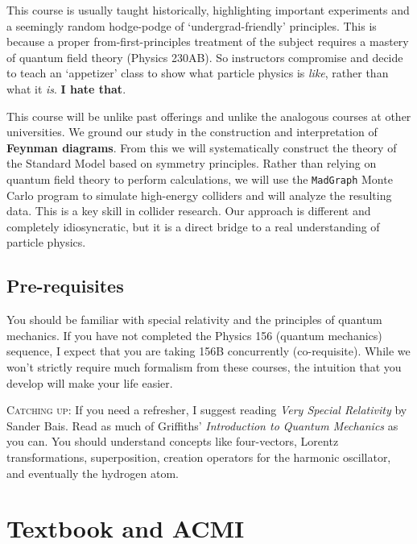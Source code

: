 \documentclass[12pt]{article}
\numberwithin{equation}{section}    %
\begin{document}
This course is usually taught historically,  highlighting important experiments and a seemingly random hodge-podge of `undergrad-friendly' principles. This is because a proper from-first-principles treatment of the subject requires a mastery of quantum field theory (Physics 230AB). So instructors compromise and decide to teach an `appetizer' class to show what particle physics is \emph{like}, rather than what it \emph{is}. \textbf{I hate that}.


This course will be unlike past offerings and unlike the analogous courses at other universities.
%
We ground our study in the construction and interpretation of \textbf{Feynman diagrams}. From this we will systematically construct the theory of the Standard Model based on symmetry principles. Rather than relying on quantum field theory to perform calculations, we will use the \texttt{MadGraph} Monte Carlo program to simulate high-energy colliders and will analyze the resulting data. This is a key skill in collider research.
%
Our approach is different and completely idiosyncratic, but it is a direct bridge to a real understanding of particle physics.



\subsection*{Pre-requisites}

You should be familiar with special relativity and the principles of quantum mechanics. If you have not completed the Physics 156 (quantum mechanics) sequence, I expect that you are taking 156B concurrently (co-requisite). While we won't strictly require much formalism from these courses, the intuition that you develop will make your life easier. 

\textsc{Catching up:} If you need a refresher, I suggest reading \emph{Very Special Relativity} by Sander Bais. Read as much of Griffiths' \emph{Introduction to Quantum Mechanics} as you can. You should understand concepts like four-vectors, Lorentz transformations, superposition, creation operators for the harmonic oscillator, and eventually the hydrogen atom.

\section*{Textbook and ACMI}
\end{document}
